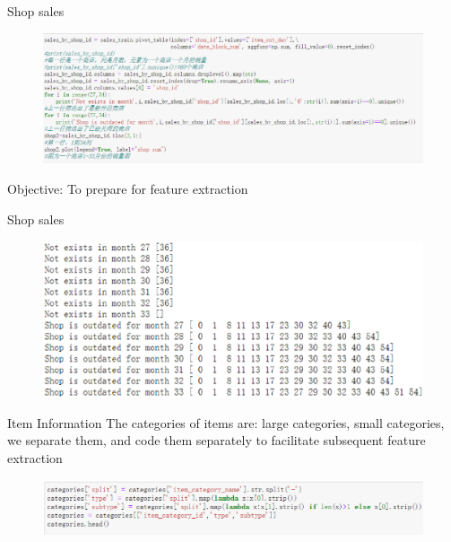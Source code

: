 \documentclass[
 size=14pt,
 paper=smartboard,  %
 mode=present, 		%
 display=slides, 	%
 style=tuliplab,  	%
 pauseslide,
 fleqn,leqno]{powerdot}
\begin{document}
\begin{slide}[toc=,bm=]{Shop sales}
  \begin{figure}
    \includegraphics[scale=0.5]{picture/data_10.eps}
  \end{figure}
  \begin{center}
    Objective: To prepare for feature extraction
  \end{center}
\end{slide}


\begin{slide}[toc=,bm=]{Shop sales}
  \begin{figure}
    \includegraphics[scale=0.5]{picture/data_11.eps}
  \end{figure}
\end{slide}

\begin{slide}[toc=,bm=]{Item Information}
  The categories of items are: large categories, small categories, we separate them, and code them separately to facilitate subsequent feature extraction
  \begin{figure}
    \includegraphics[scale=0.5]{picture/data_13.eps}
  \end{figure}
\end{slide}
\end{document}
